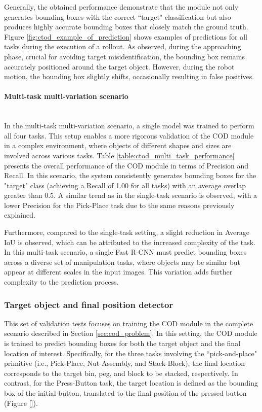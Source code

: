 Generally, the obtained performance demonstrate that the module not only generates bounding boxes with the correct ``target" classification but also produces highly accurate bounding boxes that closely match the ground truth. Figure \ref{fig:ctod_example_of_prediction} shows examples of predictions for all tasks during the execution of a rollout. As observed, during the approaching phase, crucial for avoiding target misidentification, the bounding box remains accurately positioned around the target object. However, during the robot motion, the bounding box slightly shifts, occasionally resulting in false positives.



\paragraph*{Multi-task multi-variation scenario}\mbox{}\\
In the multi-task multi-variation scenario, a single model was trained to perform all four tasks. This setup enables a more rigorous validation of the COD module in a complex environment, where objects of different shapes and sizes are involved across various tasks. Table \ref{table:ctod_multi_task_performance} presents the overall performance of the COD module in terms of Precision and Recall. In this scenario, the system consistently generates bounding boxes for the "target" class (achieving a Recall of 1.00 for all tasks) with an average overlap greater than 0.5. A similar trend as in the single-task scenario is observed, with a lower Precision for the Pick-Place task due to the same reasons previously explained.

Furthermore, compared to the single-task setting, a slight reduction in Average IoU is observed, which can be attributed to the increased complexity of the task. In this multi-task scenario, a single Fast R-CNN must predict bounding boxes across a diverse set of manipulation tasks, where objects may be similar but appear at different scales in the input images. This variation adds further complexity to the prediction process.


\subsubsection{Target object and final position detector}
\label{sec:cod_tofpd}
This set of validation tests focuses on training the COD module in the complete scenario described in Section \ref{sec:cod_problem}. In this setting, the COD module is trained to predict bounding boxes for both the target object and the final location of interest. Specifically, for the three tasks involving the ``pick-and-place" primitive (i.e., Pick-Place, Nut-Assembly, and Stack-Block), the final location corresponds to the target bin, peg, and block to be stacked, respectively. In contrast, for the Press-Button task, the target location is defined as the bounding box of the initial button, translated to the final position of the pressed button (Figure \ref{}).

